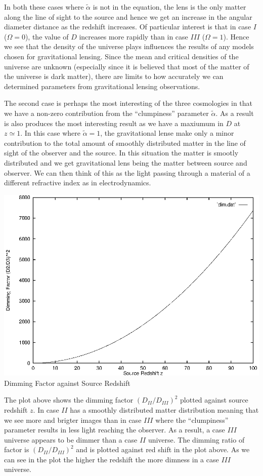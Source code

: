 \documentclass[a4paper]{IEEEtran}
\begin{document}
In both these cases where $\tilde{\alpha}$ is not in the equation, 
the lens is the only matter along the line of sight to the source and
hence we get an increase in the angular diameter distance as the redshift 
increases. Of particular interest is that in case $I$ ($\Omega = 0$), 
the value of $D$ increases more rapidly than in case $III$ ($\Omega = 1$).
Hence we see that the density of the universe plays influences the results
of any models chosen for gravitational lensing. Since the mean and 
critical densities of the universe are unknown (especially since it is
believed that most of the matter of the universe is dark matter), 
there are limits to how accurately we can determined parameters from
gravitational lensing observations.

The second case is perhaps the most interesting of the three cosmologies
in that we have a non-zero contribution from the ``clumpiness'' parameter
$\tilde{\alpha}$. As a result is also produces the most interesting result
as we have a maxiumum in $D$ at $z \simeq 1$. 
In this case where $\tilde{\alpha} = 1$, the gravitational lense
make only a minor contribution to the total amount of smoothly distributed
matter in the line of sight of the observer and the source. In this situation
the matter is smootly distributed and we get gravitational lens being
the matter between source and observer. We can then think of this
as the light passing through a material of a different refractive index
as in electrodynamics.

\begin{center}
    \includegraphics[width=\columnwidth]{results/dim.eps}
    \\[1mm]
    Dimming Factor against Source Redshift
\end{center}
The plot above shows the dimming factor $(D_{II}/D_{III})^2$ plotted
against source redshift $z$. In case $II$ has a smoothly distributed
matter distribution meaning that we see more and brigter images than
in case $III$ where the ``clumpiness'' parameter results in less
light reaching the observer. As a result, a case $III$ universe appears
to be dimmer than a case $II$ universe. The dimming ratio of factor
is $(D_{II}/D_{III})^2$ and is plotted against red shift in the plot above.
As we can see in the plot the higher the redshift the more dimness in
a case $III$ universe.
\end{document}
